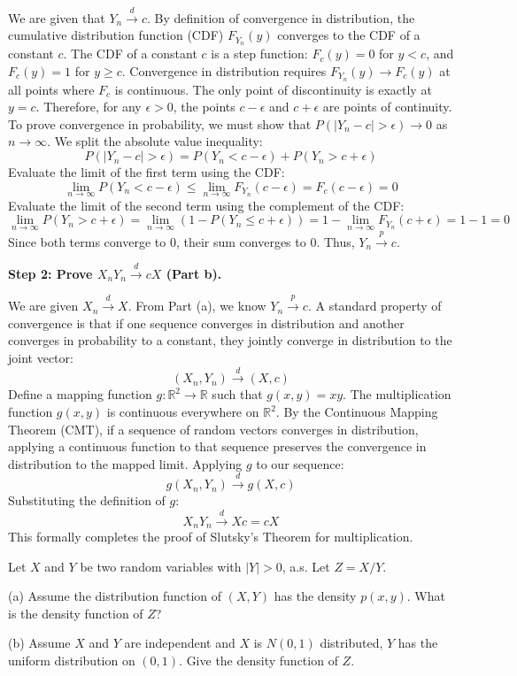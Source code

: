 \begin{solution}
We are given that $Y_n \xrightarrow{d} c$. By definition of convergence in distribution, the cumulative distribution function (CDF) $F_{Y_n}(y)$ converges to the CDF of a constant $c$.
The CDF of a constant $c$ is a step function: $F_c(y) = 0$ for $y < c$, and $F_c(y) = 1$ for $y \geq c$.
Convergence in distribution requires $F_{Y_n}(y) \to F_c(y)$ at all points where $F_c$ is continuous. The only point of discontinuity is exactly at $y = c$. Therefore, for any $\epsilon > 0$, the points $c - \epsilon$ and $c + \epsilon$ are points of continuity.
To prove convergence in probability, we must show that $P(|Y_n - c| > \epsilon) \to 0$ as $n \to \infty$.
We split the absolute value inequality:
\[ P(|Y_n - c| > \epsilon) = P(Y_n < c - \epsilon) + P(Y_n > c + \epsilon) \]
Evaluate the limit of the first term using the CDF:
\[ \lim_{n \to \infty} P(Y_n < c - \epsilon) \leq \lim_{n \to \infty} F_{Y_n}(c - \epsilon) = F_c(c - \epsilon) = 0 \]
Evaluate the limit of the second term using the complement of the CDF:
\[ \lim_{n \to \infty} P(Y_n > c + \epsilon) = \lim_{n \to \infty} (1 - P(Y_n \leq c + \epsilon)) = 1 - \lim_{n \to \infty} F_{Y_n}(c + \epsilon) = 1 - 1 = 0 \]
Since both terms converge to 0, their sum converges to 0. Thus, $Y_n \xrightarrow{p} c$.

\textbf{Step 2: Prove $X_n Y_n \xrightarrow{d} cX$ (Part b).}

We are given $X_n \xrightarrow{d} X$. From Part (a), we know $Y_n \xrightarrow{p} c$.
A standard property of convergence is that if one sequence converges in distribution and another converges in probability to a constant, they jointly converge in distribution to the joint vector:
\[ (X_n, Y_n) \xrightarrow{d} (X, c) \]
Define a mapping function $g: \mathbb{R}^2 \to \mathbb{R}$ such that $g(x, y) = xy$.
The multiplication function $g(x,y)$ is continuous everywhere on $\mathbb{R}^2$.
By the Continuous Mapping Theorem (CMT), if a sequence of random vectors converges in distribution, applying a continuous function to that sequence preserves the convergence in distribution to the mapped limit.
Applying $g$ to our sequence:
\[ g(X_n, Y_n) \xrightarrow{d} g(X, c) \]
Substituting the definition of $g$:
\[ X_n Y_n \xrightarrow{d} X c = cX \]
This formally completes the proof of Slutsky's Theorem for multiplication.
\end{solution}

\begin{exercise}\label{probability:2014:7}
Let $X$ and $Y$ be two random variables with $|Y| > 0$, a.s. Let $Z = X/Y$.

(a) Assume the distribution function of $(X,Y)$ has the density $p(x,y)$. What is the density function of $Z$?

(b) Assume $X$ and $Y$ are independent and $X$ is $N(0,1)$ distributed, $Y$ has the uniform distribution on $(0,1)$. Give the density function of $Z$.
\end{exercise}

